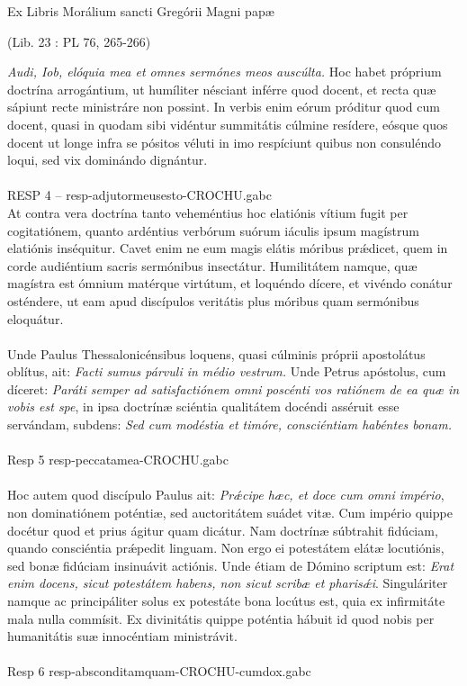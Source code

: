 \documentclass[options]{article}
\begin{document}
	Ex Libris Morálium sancti Gregórii Magni papæ
	\begin{flushright}	
	(Lib. 23 : PL 76, 265-266)	
	\end{flushright}
	\emph{Audi, Iob, elóquia mea et omnes sermónes meos auscúlta.} Hoc habet próprium doctrína arrogántium, ut humíliter nésciant inférre quod docent, et recta quæ sápiunt recte ministráre non possint. In verbis enim eórum próditur quod cum docent, quasi in quodam sibi vidéntur summitátis cúlmine resídere, eósque quos docent ut longe infra se pósitos véluti in imo respíciunt quibus non consuléndo loqui, sed vix dominándo dignántur.\\
	\\
	RESP 4 -- resp-adjutormeusesto-CROCHU.gabc
	\\
	At contra vera doctrína tanto veheméntius hoc elatiónis vítium fugit per cogitatiónem, quanto ardéntius verbórum suórum iáculis ipsum magístrum elatiónis inséquitur. Cavet enim ne eum magis elátis móribus pr\'{æ}dicet, quem in corde audiéntium sacris sermónibus insectátur. Humilitátem namque, quæ magístra est ómnium matérque virtútum, et loquéndo dícere, et vivéndo conátur osténdere, ut eam apud discípulos veritátis plus móribus quam sermónibus eloquátur.\\
	\\
	Unde Paulus Thessalonicénsibus loquens, quasi cúlminis próprii apostolátus oblítus, ait: \emph{Facti sumus párvuli in médio vestrum.} Unde Petrus apóstolus, cum díceret: \emph{Paráti semper ad satisfactiónem omni poscénti vos ratiónem de ea quæ in vobis est spe}, in ipsa doctrínæ sciéntia qualitátem docéndi asséruit esse servándam, subdens: \emph{Sed cum modéstia et timóre, consciéntiam habéntes bonam.}\\
	\\
	Resp 5  resp-peccatamea-CROCHU.gabc\\
	\\
	Hoc autem quod discípulo Paulus ait: \emph{Pr\'{æ}cipe hæc, et doce cum omni império}, non dominatiónem poténtiæ, sed auctoritátem suádet vitæ. Cum império quippe docétur quod et prius ágitur quam dicátur. Nam doctrínæ súbtrahit fidúciam, quando consciéntia pr\'{æ}pedit linguam. Non ergo ei potestátem elátæ locutiónis, sed bonæ fidúciam insinuávit actiónis. Unde étiam de Dómino scriptum est: \emph{Erat enim docens, sicut potestátem habens, non sicut scribæ et pharis\'{æ}i}. Singuláriter namque ac principáliter solus ex potestáte bona locútus est, quia ex infirmitáte mala nulla commísit. Ex divinitátis quippe poténtia hábuit id quod nobis per humanitátis suæ innocéntiam ministrávit.\\
	\\
	Resp 6 resp-absconditamquam-CROCHU-cumdox.gabc
	\\
\end{document}
